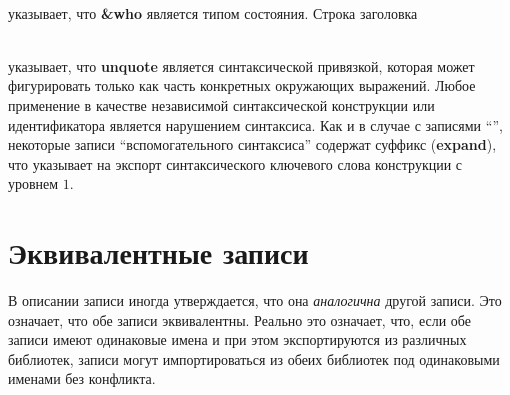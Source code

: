 \noindent{}\\
указывает, что {\bfseries\cf\&who} является типом состояния. Строка заголовка

\noindent{}\\
указывает, что {\bfseries\cf unquote} является синтаксической привязкой, которая может
фигурировать только как часть конкретных окружающих выражений. Любое применение
в качестве независимой синтаксической конструкции или идентификатора является нарушением
синтаксиса. Как и в случае с записями ``\exprtype'', некоторые записи ``вспомогательного синтаксиса''
содержат суффикс ({\bfseries\cf expand}), что указывает на экспорт синтаксического ключевого слова
конструкции с уровнем $1$.\vspace{1mm}

\section {Эквивалентные записи}\vspace{1mm}

В описании записи иногда утверждается, что она \textit{аналогична} другой записи. Это
означает, что обе записи эквивалентны. Реально это означает, что, если обе записи имеют
одинаковые имена и при этом экспортируются из различных библиотек, записи
могут импортироваться из обеих библиотек под одинаковыми именами без конфликта.\vspace{1mm}

